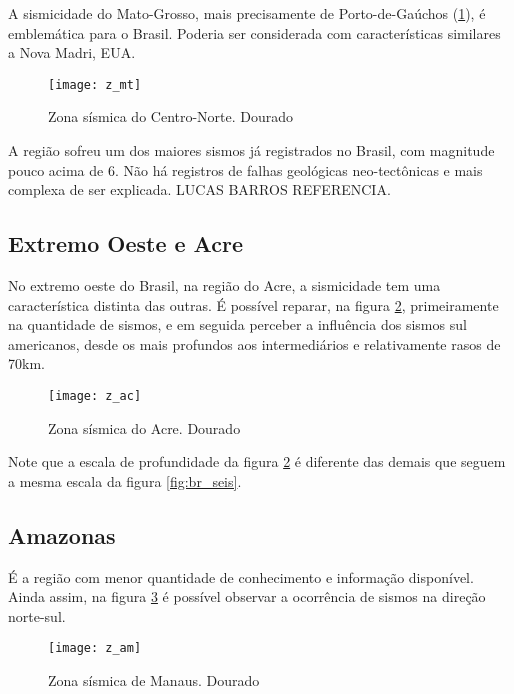 A sismicidade do Mato-Grosso, mais precisamente de Porto-de-Gaúchos (\ref{fig:z_mt}), é emblemática para o Brasil.
Poderia ser considerada com características similares a Nova Madri, EUA.

\begin{figure}[H]
  \centering
  \texttt{[image: z\_mt]} 
  \caption{Zona sísmica do Centro-Norte. Dourado}
  \label{fig:z_mt} 
\end{figure}

A região sofreu um dos maiores sismos já registrados no Brasil, com magnitude pouco acima de 6.
Não há registros de falhas geológicas neo-tectônicas e mais complexa de ser explicada. LUCAS BARROS REFERENCIA.

\subsection{Extremo Oeste e Acre}
\label{sec:z_ac}

No extremo oeste do Brasil, na região do Acre, a sismicidade tem uma característica distinta das outras.
É possível reparar, na figura \ref{fig:z_ac}, primeiramente na quantidade de sismos, e em
seguida perceber a influência dos sismos sul americanos, desde os mais profundos aos intermediários
e relativamente rasos de 70km. 


\begin{figure}[H]
  \centering
  \texttt{[image: z\_ac]} 
  \caption{Zona sísmica do Acre. Dourado}
  \label{fig:z_ac} 
\end{figure}

Note que a escala de profundidade da figura \ref{fig:z_ac} é diferente das demais que seguem a
mesma escala da figura \ref{fig:br_seis}.


\subsection{Amazonas}
\label{sec:z_am}

É a região com menor quantidade de conhecimento e informação disponível.
Ainda assim, na figura \ref{fig:z_am} é possível observar a ocorrência de sismos
na direção norte-sul.

\begin{figure}[H]
  \centering
  \texttt{[image: z\_am]} 
  \caption{Zona sísmica de Manaus. Dourado}
  \label{fig:z_am} 
\end{figure}

